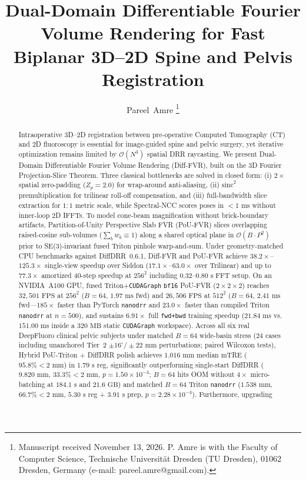 \documentclass[journal,twoside,web]{ieeecolor}
\begin{document}
\title{Dual-Domain Differentiable Fourier Volume Rendering for Fast Biplanar 3D--2D Spine and Pelvis Registration}

\author{Pareel~Amre%
\thanks{Manuscript received November 13, 2026. P. Amre is with the Faculty of Computer Science, Technische Universit\"at Dresden (TU Dresden), 01062 Dresden, Germany (e-mail: pareel.amre@gmail.com).}%
}

\maketitle

\begin{abstract}
Intraoperative 3D--2D registration between pre-operative Computed Tomography (CT) and 2D fluoroscopy is essential for image-guided spine and pelvic surgery, yet iterative optimization remains limited by $\mathcal{O}(N^3)$ spatial DRR raycasting. We present Dual-Domain Differentiable Fourier Volume Rendering (Diff-FVR), built on the 3D Fourier Projection-Slice Theorem. Three classical bottlenecks are solved in closed form: (i) $2\times$ spatial zero-padding ($Z_p=2.0$) for wrap-around anti-aliasing, (ii) $\mathrm{sinc}^2$ premultiplication for trilinear roll-off compensation, and (iii) full-bandwidth slice extraction for $1:1$ metric scale, while Spectral-NCC scores poses in $<1\text{ ms}$ without inner-loop 2D IFFTs. To model cone-beam magnification without brick-boundary artifacts, Partition-of-Unity Perspective Slab FVR (PoU-FVR) slices overlapping raised-cosine sub-volumes ($\sum_b w_b \equiv 1$) along a shared optical plane in $\mathcal{O}(B \cdot P^2)$ prior to SE(3)-invariant fused Triton pinhole warp-and-sum. Under geometry-matched CPU benchmarks against DiffDRR~0.6.1, Diff-FVR and PoU-FVR achieve $38.2\times$--$125.3\times$ single-view speedup over Siddon ($17.1\times$--$63.0\times$ over Trilinear) and up to $77.3\times$ amortized 40-step speedup at $256^2$ including $0.32$--$0.80\text{ s}$ FFT setup. On an NVIDIA~A100 GPU, fused Triton+\texttt{CUDAGraph} \texttt{bf16} PoU-FVR ($2\times 2\times 2$) reaches $32{,}501\text{ FPS}$ at $256^2$ ($B{=}64$, $1.97\text{ ms}$ fwd) and $26{,}506\text{ FPS}$ at $512^2$ ($B{=}64$, $2.41\text{ ms}$ fwd---$185\times$ faster than PyTorch \texttt{nanodrr} and $23.0\times$ faster than compiled Triton \texttt{nanodrr} at $n{=}500$), and sustains $6.91\times$ full \texttt{fwd+bwd} training speedup ($21.84\text{ ms}$ vs.\ $151.00\text{ ms}$ inside a $320\text{ MB}$ static \texttt{CUDAGraph} workspace). Across all six real DeepFluoro clinical pelvic subjects under matched $B{=}64$ wide-basin stress ($24$ cases including unanchored Tier~2 $\pm 16^\circ/\pm 22\text{ mm}$ perturbations; paired Wilcoxon tests), Hybrid PoU-Triton + DiffDRR polish achieves $1.016\text{ mm}$ median mTRE ($95.8\% <2\text{ mm}$) in $1.79\text{ s}$ reg, significantly outperforming single-start DiffDRR ($9.820\text{ mm}$, $33.3\% <2\text{ mm}$, $p=1.50\times 10^{-4}$; $B{=}64$ hits OOM without $4\times$ micro-batching at $184.1\text{ s}$ and $21.6\text{ GB}$) and matched $B{=}64$ Triton \texttt{nanodrr} ($1.538\text{ mm}$, $66.7\% <2\text{ mm}$, $5.30\text{ s}$ reg + $3.91\text{ s}$ prep, $p=2.28\times 10^{-4}$). Furthermore, upgrading 
\end{abstract}
\end{document}
